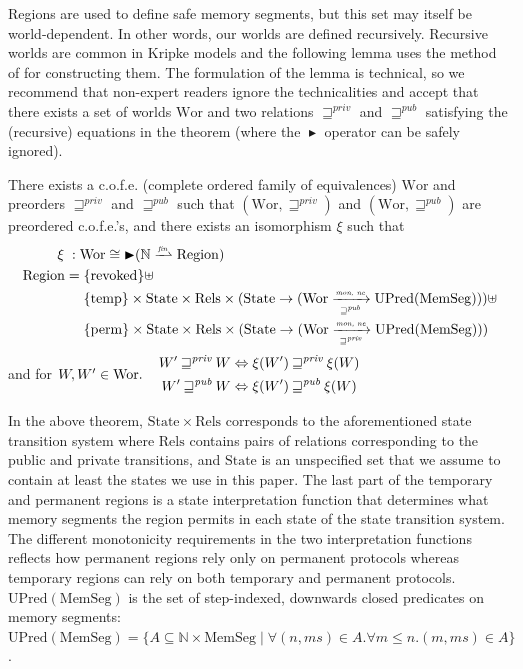 \documentclass[format=acmsmall, review=false, screen=true]{acmart}
\newcommand{\finparfun}{\xrightharpoonup{\textit{\tiny{fin}}}}
\newcommand{\fun}{\rightarrow}
\newcommand{\blater}{\mathop{\blacktriangleright}}
\newcommand{\cofe}{c.o.f.e.}
\newcommand{\cofes}{\cofe{}'s}
\newcommand\lau[1]{{\color{purple} \sf \footnotesize {LS: #1}}\\}
\newcommand\dominique[1]{{\color{purple} \sf \footnotesize {DD: #1}}\\}
\renewcommand\lau[1]{}
\renewcommand\dominique[1]{}
\newcommand{\var}[1]{\mathit{#1}}
\newcommand{\futurewk}{\mathbin{\sqsupseteq}^{\var{pub}}}
\newcommand{\futurestr}{\mathbin{\sqsupseteq}^{\var{priv}}}
\newcommand{\monwknefun}{\xrightarrow[\text{\tiny{$\futurewk$}}]{\textit{\tiny{mon, ne}}}}
\newcommand{\monstrnefun}{\xrightarrow[\text{\tiny{$\futurestr$}}]{\textit{\tiny{mon, ne}}}}
\newcommand{\plaindom}[1]{\mathrm{#1}}
\newcommand{\HeapSegments}{\plaindom{MemSeg}}
\newcommand{\nats}{\mathbb{N}}
\newcommand{\Rels}{\plaindom{Rels}}
\newcommand{\States}{\plaindom{State}}
\newcommand{\Regions}{\plaindom{Region}}
\newcommand{\Wor}{\plaindom{Wor}}
\newcommand{\UPred}[1]{\plaindom{UPred}(#1)}
\newcommand{\plainview}[1]{\mathrm{#1}}
\newcommand{\perma}{\plainview{perm}}
\newcommand{\temp}{\plainview{temp}}
\newcommand{\revoked}{\plainview{revoked}}
\begin{document}
Regions are used to define safe memory segments, but this set may itself be world-dependent. In other
words, our worlds are defined recursively. Recursive worlds are common
in Kripke models and the following lemma uses the method of
\citet{Birkedal:2011:SKM:1926385.1926401,Birkedal:tutorial-notes} for
constructing them. The formulation of the lemma is technical, so we recommend
that non-expert readers ignore the technicalities and accept that there exists a
set of worlds $\Wor$ and two relations $\futurestr$ and $\futurewk$ satisfying
the (recursive) equations in the theorem (where the $\blater$ operator can be
safely ignored).
\begin{theorem}\label{thm:world-existence}
  There exists a \cofe{} (complete ordered family of equivalences) $\Wor$ and preorders $\futurestr$ and
  $\futurewk$ such that $(\Wor,\futurestr)$ and $(\Wor,\futurewk)$ are
  preordered \cofes{}, and there exists an isomorphism $\xi$ such that
  \begin{align*}
      \xi \; : \; & \Wor \cong \blater (\nats \finparfun \Regions)\\
      \Regions  = & \; \{\revoked\} \uplus \\
               & \; \{\temp\} \times \States \times \Rels \times (\States \fun (\Wor \monwknefun \UPred{\HeapSegments}))\uplus \\
               & \; \{\perma\} \times \States \times \Rels \times (\States \fun (\Wor \monstrnefun \UPred{\HeapSegments}))
    \end{align*}
  and for $W, W' \in \Wor\ldotp \quad  
  \begin{aligned}
    W' \futurestr W & \Leftrightarrow \xi(W') \futurestr \xi(W)   \\
    W' \futurewk W & \Leftrightarrow \xi(W') \futurewk \xi(W)
  \end{aligned}$
\end{theorem}
In the above theorem, $\States \times \Rels$ corresponds to the aforementioned
state transition system where $\Rels$ contains pairs of relations corresponding
to the public and private transitions, and $\States$ is an unspecified set that
we assume to contain at least the states we use in this paper. The last part of
the temporary and permanent regions is a state interpretation function that
determines what memory segments the region permits in each state of the state
transition system.  The different monotonicity requirements in the two
interpretation functions reflects how permanent regions rely only on permanent
protocols whereas temporary regions can rely on both temporary and permanent
protocols.  $\UPred{\HeapSegments}$ is the set of step-indexed, downwards closed
predicates on memory segments:
$\UPred{\HeapSegments} = \{ A \subseteq  \nats \times
\HeapSegments \mid 
\forall (n, ms) \in A. \forall m
\leq n. (m, ms) \in A\}$. 
\
\end{document}
